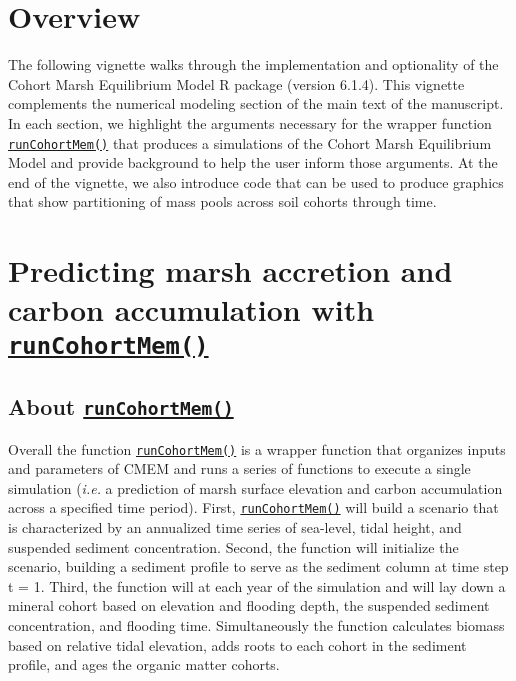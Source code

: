 \hypertarget{overview}{%
\section{Overview}\label{overview}}

The following vignette walks through the implementation and optionality
of the Cohort Marsh Equilibrium Model R package (version 6.1.4). This
vignette complements the numerical modeling section of the main text of
the manuscript. In each section, we highlight the arguments necessary
for the wrapper function
\protect\hyperlink{runcohortmem}{\texttt{runCohortMem()}} that produces
a simulations of the Cohort Marsh Equilibrium Model and provide
background to help the user inform those arguments. At the end of the
vignette, we also introduce code that can be used to produce graphics
that show partitioning of mass pools across soil cohorts through time.

\hypertarget{predicting-marsh-accretion-and-carbon-accumulation-with-runcohortmem}{%
\section{\texorpdfstring{Predicting marsh accretion and carbon
accumulation with
\protect\hyperlink{runcohortmem}{\texttt{runCohortMem()}}}{Predicting marsh accretion and carbon accumulation with runCohortMem()}}\label{predicting-marsh-accretion-and-carbon-accumulation-with-runcohortmem}}

\hypertarget{about-runcohortmem}{%
\subsection{\texorpdfstring{About
\protect\hyperlink{runcohortmem}{\texttt{runCohortMem()}}}{About runCohortMem()}}\label{about-runcohortmem}}

Overall the function
\protect\hyperlink{runcohortmem}{\texttt{runCohortMem()}} is a wrapper
function that organizes inputs and parameters of CMEM and runs a series
of functions to execute a single simulation (\emph{i.e.} a prediction of
marsh surface elevation and carbon accumulation across a specified time
period). First,
\protect\hyperlink{runcohortmem}{\texttt{runCohortMem()}} will build a
scenario that is characterized by an annualized time series of
sea-level, tidal height, and suspended sediment concentration. Second,
the function will initialize the scenario, building a sediment profile
to serve as the sediment column at time step t = 1. Third, the function
will at each year of the simulation and will lay down a mineral cohort
based on elevation and flooding depth, the suspended sediment
concentration, and flooding time. Simultaneously the function calculates
biomass based on relative tidal elevation, adds roots to each cohort in
the sediment profile, and ages the organic matter cohorts.


